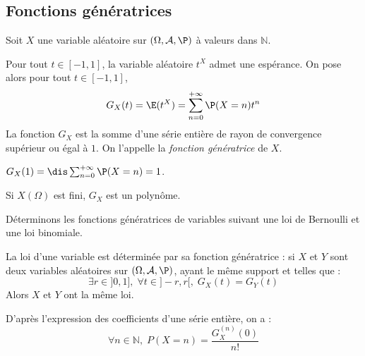 \documentclass[a4paper,10pt]{report}
\begin{document}
\subsection{Fonctions génératrices}
\begin{defip} Soit $X$ une variable aléatoire sur $(\Omega, \mathcal{A}, \P)$ à valeurs dans $\mathbb{N}$.

\noindent Pour tout $t \in [-1,1]$, la variable aléatoire $t^X$ admet une espérance. On pose alors pour tout $t \in [-1,1]$,
$$ G_X(t)= \E(t^X) = \sum_{n=0}^{+ \infty} \P(X=n) t^n$$
La fonction $G_X$ est la somme d'une série entière de rayon de convergence supérieur ou égal à $1$. On l'appelle la \textit{fonction génératrice} de $X$.
\end{defip}

\begin{preuve}
\vspace{5cm}
\end{preuve}

\begin{rems}
\item $G_X(1)= \dis \sum_{n=0}^{+ \infty} \P(X=n)=1$.
\item Si $X(\Omega)$ est fini, $G_X$ est un polynôme.
\end{rems}

\begin{ex} Déterminons les fonctions génératrices de variables suivant une loi de Bernoulli et une loi binomiale.

\vspace{5cm}
\end{ex}

\begin{prop} La loi d'une variable est déterminée par sa fonction génératrice : si $X$ et $Y$ sont deux variables aléatoires sur $(\Omega, \mathcal{A}, \P)$, ayant le même support et telles que :
$$ \exists r \in ]0,1], \; \forall t \in ]-r,r[, \; G_X(t)=G_Y(t)$$
Alors $X$ et $Y$ ont la même loi.
\end{prop}

\begin{preuve}

\vspace{3cm}
\end{preuve}

\begin{rem} D'après l'expression des coefficients d'une série entière, on a :
$$ \forall n \in \mathbb{N}, \; P(X=n) = \dfrac{G_X^{(n)}(0)}{n!}$$
\end{rem}
\end{document}
